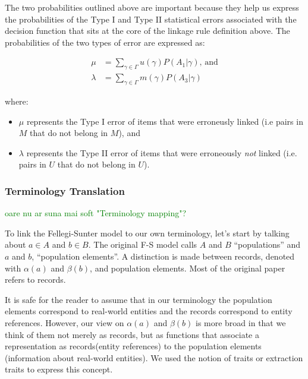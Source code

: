 \documentclass[lettersize,journal]{IEEEtran}
\begin{document}
    The two probabilities outlined above are important because they help us
    express the probabilities of the Type I and Type II statistical errors
    associated with the decision function that sits at the core of the linkage
    rule definition above.
    The probabilities of the two types of error are expressed as:

    \begin{align}
        \mu&=\sum_{\gamma \in \varGamma}u(\gamma)P(A_1|\gamma)\textrm{,~and}\nonumber\\
        \lambda&=\sum_{\gamma \in \varGamma}m(\gamma)P(A_3|\gamma)\nonumber
    \end{align}

    where:

    \begin{itemize}
        \item $\mu$ represents the Type I error of items that were erroneusly
        linked (i.e pairs in $M$ that do not belong in $M$), and
        \item $\lambda$ represents the Type II error of items that were
        erroneously \textit{not} linked (i.e. pairs in $U$ that do not belong in
        $U$).
    \end{itemize}

    \subsubsection[fms-term]{Terminology Translation}\label{fsm-term}
    \textcolor{green}{oare nu ar suna mai soft "Terminology mapping"?}

    To link the Fellegi-Sunter model to our own terminology, let's start by
    talking about $a \in A$ and $b \in B$.
    The original F-S model calls $A$ and $B$ ``populations'' and $a$ and $b$,
    ``population elements''.
    A distinction is made between records, denoted with $\alpha(a)$ and
    $\beta(b)$, and population elements.
    Most of the original paper refers to records.

    It is safe for the reader to assume that in our terminology the population
    elements correspond to real-world entities and the records correspond to
    entity references.
    However, our view on $\alpha(a)$ and $\beta(b)$ is more broad in that we
    think of them not merely as records, but as functions that associate a
    representation as records(entity references) to the population elements
    (information about real-world entities).
    We used the notion of traits or extraction traits to express this concept.
        
\end{document}
